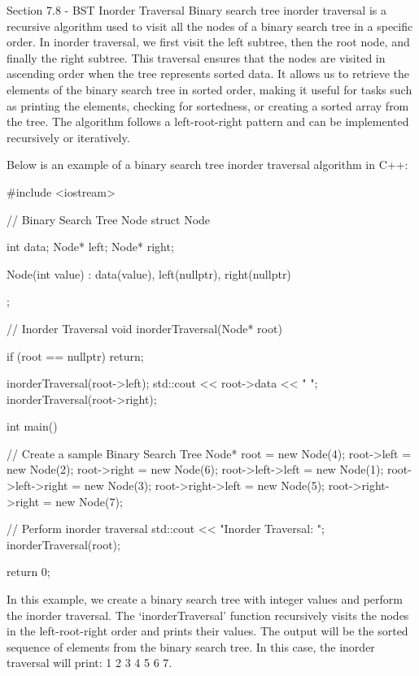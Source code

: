 \begin{notes}{Section 7.8 - BST Inorder Traversal}
    Binary search tree inorder traversal is a recursive algorithm used to visit all the nodes of a binary search tree in a specific order. In inorder traversal, we first visit the left subtree, then the root node, and finally the right subtree. This traversal ensures that the nodes are visited in ascending order when the tree represents sorted 
    data. It allows us to retrieve the elements of the binary search tree in sorted order, making it useful for tasks such as printing the elements, checking for sortedness, or creating a sorted array from the tree. The algorithm follows a left-root-right pattern and can be implemented recursively or iteratively.
    
    \begin{highlight}
        Below is an example of a binary search tree inorder traversal algorithm in C++:
    
    \begin{code}[C++]
    #include <iostream>
    
    // Binary Search Tree Node
    struct Node {
        int data;
        Node* left;
        Node* right;
    
        Node(int value) : data(value), left(nullptr), right(nullptr) {}
    };
    
    // Inorder Traversal
    void inorderTraversal(Node* root) {
        if (root == nullptr)
            return;
    
        inorderTraversal(root->left);
        std::cout << root->data << " ";
        inorderTraversal(root->right);
    }
    
    int main() {
        // Create a sample Binary Search Tree
        Node* root = new Node(4);
        root->left = new Node(2);
        root->right = new Node(6);
        root->left->left = new Node(1);
        root->left->right = new Node(3);
        root->right->left = new Node(5);
        root->right->right = new Node(7);
    
        // Perform inorder traversal
        std::cout << "Inorder Traversal: ";
        inorderTraversal(root);
    
        return 0;
    }
    \end{code}
        In this example, we create a binary search tree with integer values and perform the inorder traversal. The `inorderTraversal' function recursively visits the nodes in the left-root-right order and prints their values. The output will be the sorted sequence of elements from the binary search tree. In this case, the inorder 
        traversal will print: 1 2 3 4 5 6 7.
    \end{highlight}    
\end{notes}


